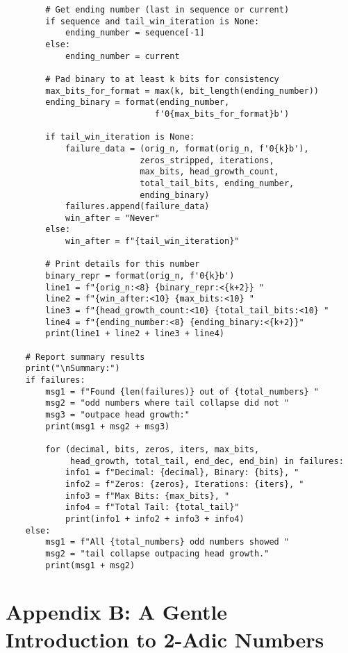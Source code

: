 \documentclass[10pt,letterpaper]{article}
\begin{document}
\begin{lstlisting}
        # Get ending number (last in sequence or current)
        if sequence and tail_win_iteration is None:
            ending_number = sequence[-1]
        else:
            ending_number = current
            
        # Pad binary to at least k bits for consistency
        max_bits_for_format = max(k, bit_length(ending_number))
        ending_binary = format(ending_number, 
                              f'0{max_bits_for_format}b')
        
        if tail_win_iteration is None:
            failure_data = (orig_n, format(orig_n, f'0{k}b'), 
                           zeros_stripped, iterations, 
                           max_bits, head_growth_count, 
                           total_tail_bits, ending_number, 
                           ending_binary)
            failures.append(failure_data)
            win_after = "Never"
        else:
            win_after = f"{tail_win_iteration}"
        
        # Print details for this number
        binary_repr = format(orig_n, f'0{k}b')
        line1 = f"{orig_n:<8} {binary_repr:<{k+2}} "
        line2 = f"{win_after:<10} {max_bits:<10} "
        line3 = f"{head_growth_count:<10} {total_tail_bits:<10} "
        line4 = f"{ending_number:<8} {ending_binary:<{k+2}}"
        print(line1 + line2 + line3 + line4)
        
    # Report summary results
    print("\nSummary:")
    if failures:
        msg1 = f"Found {len(failures)} out of {total_numbers} "
        msg2 = "odd numbers where tail collapse did not "
        msg3 = "outpace head growth:"
        print(msg1 + msg2 + msg3)
        
        for (decimal, bits, zeros, iters, max_bits, 
             head_growth, total_tail, end_dec, end_bin) in failures:
            info1 = f"Decimal: {decimal}, Binary: {bits}, "
            info2 = f"Zeros: {zeros}, Iterations: {iters}, "
            info3 = f"Max Bits: {max_bits}, "
            info4 = f"Total Tail: {total_tail}"
            print(info1 + info2 + info3 + info4)
    else:
        msg1 = f"All {total_numbers} odd numbers showed "
        msg2 = "tail collapse outpacing head growth."
        print(msg1 + msg2)

\end{lstlisting}

\newpage
\section*{Appendix B: A Gentle Introduction to 2-Adic Numbers}
\end{document}

